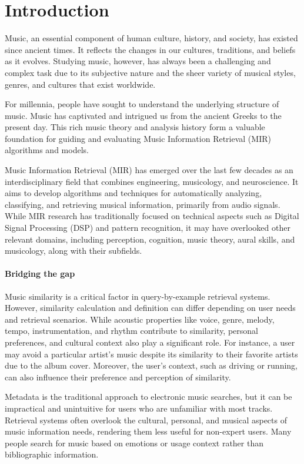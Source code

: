 \chapter{Introduction}

Music, an essential component of human culture, history, and society, has existed since ancient times. It reflects the changes in our cultures, traditions, and beliefs as it evolves. Studying music, however, has always been a challenging and complex task due to its subjective nature and the sheer variety of musical styles, genres, and cultures that exist worldwide.

For millennia, people have sought to understand the underlying structure of music. Music has captivated and intrigued us from the ancient Greeks to the present day. This rich music theory and analysis history form a valuable foundation for guiding and evaluating Music Information Retrieval (MIR) algorithms and models.

Music Information Retrieval (MIR) has emerged over the last few decades as an interdisciplinary field that combines engineering, musicology, and neuroscience. It aims to develop algorithms and techniques for automatically analyzing, classifying, and retrieving musical information, primarily from audio signals. While MIR research has traditionally focused on technical aspects such as Digital Signal Processing (DSP) and pattern recognition, it may have overlooked other relevant domains, including perception, cognition, music theory, aural skills, and musicology, along with their subfields.

\subsubsection{Bridging the gap}

Music similarity is a critical factor in query-by-example retrieval systems. However, similarity calculation and definition can differ depending on user needs and retrieval scenarios. While acoustic properties like voice, genre, melody, tempo, instrumentation, and rhythm contribute to similarity, personal preferences, and cultural context also play a significant role. For instance, a user may avoid a particular artist's music despite its similarity to their favorite artists due to the album cover. Moreover, the user's context, such as driving or running, can also influence their preference and perception of similarity. 

Metadata is the traditional approach to electronic music searches, but it can be impractical and unintuitive for users who are unfamiliar with most tracks. Retrieval systems often overlook the cultural, personal, and musical aspects of music information needs, rendering them less useful for non-expert users. Many people search for music based on emotions or usage context rather than bibliographic information.